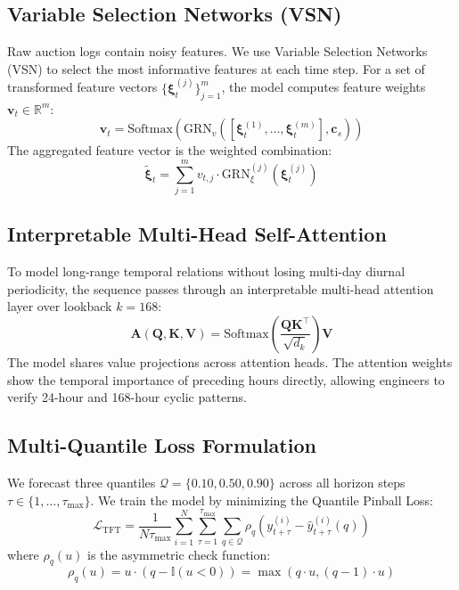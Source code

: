 \documentclass[sigconf]{acmart}
\begin{document}
\subsection{Variable Selection Networks (VSN)}
Raw auction logs contain noisy features. We use Variable Selection Networks (VSN) to select the most informative features at each time step. For a set of transformed feature vectors $\{\boldsymbol{\xi}_t^{(j)}\}_{j=1}^{m}$, the model computes feature weights $\mathbf{v}_t \in \mathbb{R}^m$:
\begin{equation}
    \mathbf{v}_t = \mathrm{Softmax}\left(\mathrm{GRN}_{v}\left([\boldsymbol{\xi}_t^{(1)}, \dots, \boldsymbol{\xi}_t^{(m)}], \mathbf{c}_s\right)\right)
\end{equation}
The aggregated feature vector is the weighted combination:
\begin{equation}
    \tilde{\boldsymbol{\xi}}_t = \sum_{j=1}^{m} v_{t, j} \cdot \mathrm{GRN}_{\xi}^{(j)}\left(\boldsymbol{\xi}_t^{(j)}\right)
\end{equation}

\subsection{Interpretable Multi-Head Self-Attention}
To model long-range temporal relations without losing multi-day diurnal periodicity, the sequence passes through an interpretable multi-head attention layer over lookback $k=168$:
\begin{equation}
    \mathbf{A}(\mathbf{Q}, \mathbf{K}, \mathbf{V}) = \mathrm{Softmax}\left(\frac{\mathbf{Q} \mathbf{K}^\top}{\sqrt{d_k}}\right)\mathbf{V}
\end{equation}
The model shares value projections across attention heads. The attention weights show the temporal importance of preceding hours directly, allowing engineers to verify 24-hour and 168-hour cyclic patterns.

\subsection{Multi-Quantile Loss Formulation}
We forecast three quantiles $\mathcal{Q} = \{0.10, 0.50, 0.90\}$ across all horizon steps $\tau \in \{1, \dots, \tau_{\max}\}$. We train the model by minimizing the Quantile Pinball Loss:
\begin{equation}
    \mathcal{L}_{\mathrm{TFT}} = \frac{1}{N \tau_{\max}} \sum_{i=1}^N \sum_{\tau=1}^{\tau_{\max}} \sum_{q \in \mathcal{Q}} \rho_q\left(y_{t+\tau}^{(i)} - \hat{y}_{t+\tau}^{(i)}(q)\right)
\end{equation}
where $\rho_q(u)$ is the asymmetric check function:
\begin{equation}
    \rho_q(u) = u \cdot \left(q - \mathbb{I}(u < 0)\right) = \max(q \cdot u, (q - 1) \cdot u)
\end{equation}
\end{document}
